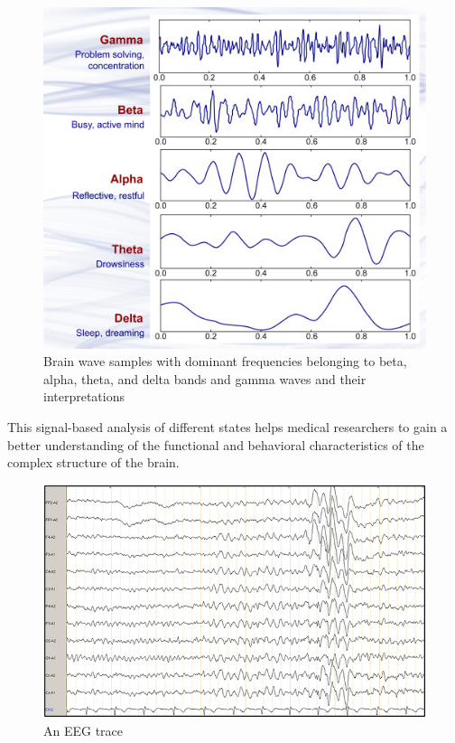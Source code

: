 \begin{figure}[ht]
    \centering
    \includegraphics{images/Th-background/brainwaves.jpg}
    \caption{Brain wave samples with dominant frequencies belonging to beta, alpha, theta, and delta bands and gamma waves and their interpretations \cite{abhang_chapter_2016}}
    \label{fig:brainwaves}
\end{figure}

This signal-based analysis of different states helps medical researchers to gain a better understanding of the functional and behavioral characteristics of the complex structure of the brain.

\begin{figure}[ht]
    \centering
    \includegraphics[width=1.0\textwidth]{images/Th-background/simple-eeg-trace.png}
    \caption{An \gls{EEG} trace \cite{tebartz_van_elst_increased_2016}}
    \label{fig:simple-eeg-trace}
\end{figure}

